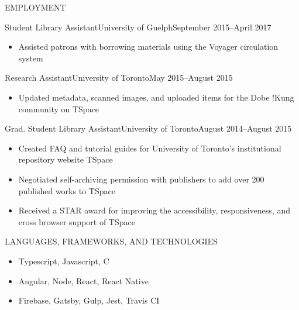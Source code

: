 \documentclass[]{mcdowellcv}
\begin{document}
	\begin{cvsection}{EMPLOYMENT}
		\begin{cvsubsection}{Student Library Assistant}{University of Guelph}{September 2015--April 2017}
			\begin{itemize}
				\item Assisted patrons with borrowing materials using the Voyager circulation system
			\end{itemize}
		\end{cvsubsection}
		
		\begin{cvsubsection}{Research Assistant}{University of Toronto}{May 2015--August 2015}	
			\begin{itemize}
				\item Updated metadata, scanned images, and uploaded items for the Dobe !Kung community on TSpace
			\end{itemize}
		\end{cvsubsection}
		
		\begin{cvsubsection}{Grad. Student Library Assistant}{University of Toronto}{August 2014--August 2015}		
			\begin{itemize}
	    			\item Created FAQ and tutorial guides for University of Toronto's institutional repository website TSpace
               			\item Negotiated self-archiving permission with publishers to add over 200 published works to TSpace
               			\item Received a STAR award for improving the accessibility, responsiveness, and cross browser support of TSpace 
			\end{itemize}
		\end{cvsubsection}
		
	\end{cvsection}

	\begin{cvsection}{LANGUAGES, FRAMEWORKS, AND TECHNOLOGIES}
		\begin{cvsubsection}{}{}{}	
			\begin{itemize}
				\item Typescript, Javascript, C
				\item Angular, Node, React, React Native
				\item Firebase, Gatsby, Gulp, Jest, Travis CI
			\end{itemize}
		\end{cvsubsection}
	\end{cvsection}
	
\end{document}
